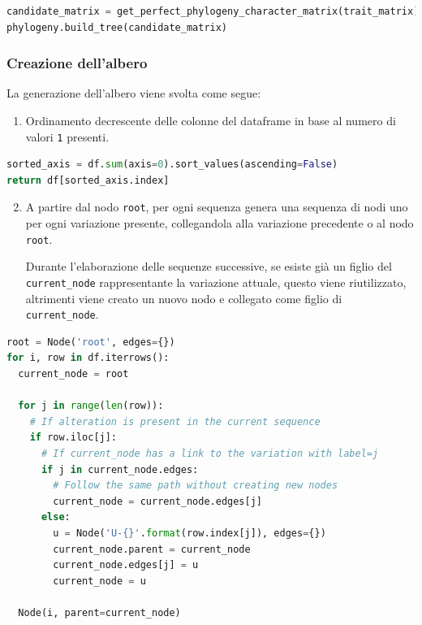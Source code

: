 \documentclass[11pt,italian]{article}
\begin{document}
\begin{lstlisting}[caption=Chiamata alla generazione dell'albero,label=code:tree_creation,language=Python]
candidate_matrix = get_perfect_phylogeny_character_matrix(trait_matrix)
phylogeny.build_tree(candidate_matrix)
\end{lstlisting}

\subsubsection{Creazione dell'albero}
\noindent
La generazione dell'albero viene svolta come segue:
\begin{enumerate}
  \item Ordinamento decrescente delle colonne del dataframe in base al numero di valori \lstinline{1} presenti.
\end{enumerate}
\begin{lstlisting}[caption=Ordinamento decrescente delle colonne,label=code:desc_column_sorting,language=Python]
sorted_axis = df.sum(axis=0).sort_values(ascending=False)
return df[sorted_axis.index]
\end{lstlisting}

\begin{enumerate}
  \setcounter{enumi}{1}
  \item A partire dal nodo \lstinline{root}, per ogni sequenza genera una sequenza di nodi uno per ogni variazione presente, collegandola alla variazione precedente o al nodo \lstinline{root}.

  Durante l'elaborazione delle sequenze successive, se esiste già un figlio del \lstinline{current_node} rappresentante la variazione attuale, questo viene riutilizzato, altrimenti viene creato un nuovo nodo e collegato come figlio di \lstinline{current_node}.
\end{enumerate}
\begin{lstlisting}[caption=Funzione di creazione dell'albero,label=code:tree_creation_function,language=Python]
root = Node('root', edges={})
for i, row in df.iterrows():
  current_node = root

  for j in range(len(row)):
    # If alteration is present in the current sequence
    if row.iloc[j]:
      # If current_node has a link to the variation with label=j
      if j in current_node.edges:
        # Follow the same path without creating new nodes
        current_node = current_node.edges[j]
      else:
        u = Node('U-{}'.format(row.index[j]), edges={})
        current_node.parent = current_node
        current_node.edges[j] = u
        current_node = u

  Node(i, parent=current_node)
  \end{lstlisting}
\end{document}
